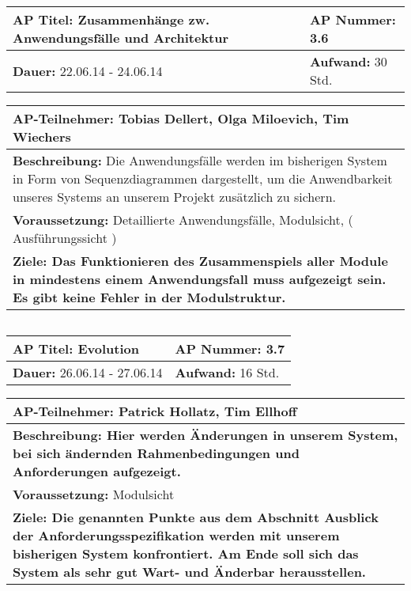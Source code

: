 \begin{tabular}{|p{7.43cm}|p{7.43cm}|}
\hline
\textbf{AP Titel: }Zusammenhänge zw. Anwendungsfälle und Architektur & \textbf{AP Nummer: }3.6\\ 
\hline
\textbf{Dauer: }22.06.14 - 24.06.14& \textbf{Aufwand: }30 Std.\\
\hline
\end{tabular}
\begin{tabular}{|p{15.3cm}|}
\hline
\textbf{AP-Teilnehmer: }Tobias Dellert, Olga Miloevich, Tim Wiechers\\
\hline
\textbf{Beschreibung: } Die Anwendungsfälle werden im bisherigen System in Form von Sequenzdiagrammen dargestellt, um die Anwendbarkeit unseres Systems an unserem Projekt
zusätzlich zu sichern.\\
\hline
\textbf{Voraussetzung: }Detaillierte Anwendungsfälle, Modulsicht, ( Ausführungssicht )\\
\hline 
\textbf{Ziele: Das Funktionieren des Zusammenspiels aller Module in mindestens einem Anwendungsfall muss aufgezeigt sein. Es gibt keine Fehler in der Modulstruktur.}\\
\hline 
\end{tabular}
\begin{verbatim}

\end{verbatim}

\begin{tabular}{|p{7.43cm}|p{7.43cm}|}
\hline
\textbf{AP Titel: }Evolution & \textbf{AP Nummer: }3.7\\ 
\hline
\textbf{Dauer: }26.06.14 - 27.06.14& \textbf{Aufwand: }16 Std.\\
\hline
\end{tabular}
\begin{tabular}{|p{15.3cm}|}
\hline
\textbf{AP-Teilnehmer: }Patrick Hollatz, Tim Ellhoff\\
\hline
\textbf{Beschreibung: Hier werden Änderungen in unserem System, bei sich ändernden Rahmenbedingungen und Anforderungen aufgezeigt.}\\
\hline
\textbf{Voraussetzung: }Modulsicht\\
\hline 
\textbf{Ziele: Die genannten Punkte aus dem Abschnitt Ausblick der Anforderungsspezifikation 
werden mit unserem bisherigen System konfrontiert. Am Ende soll sich das System als sehr gut Wart- und Änderbar herausstellen.}\\
\hline 
\end{tabular}
\begin{verbatim}

\end{verbatim}

